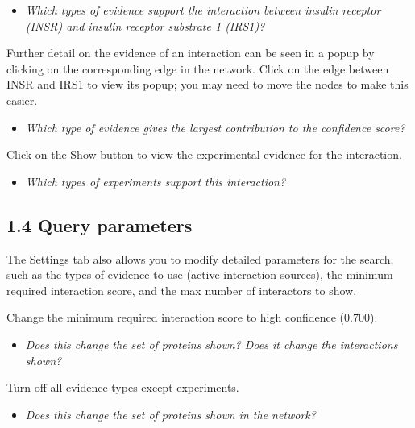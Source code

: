 \documentclass[a4paper]{article}
\begin{document}
\begin{itemize}
  \item \textit{Which types of evidence support the interaction between insulin receptor (INSR) and insulin receptor substrate 1 (IRS1)?}
\end{itemize}

Further detail on the evidence of an interaction can be seen in a popup by clicking on the corresponding edge in the network. Click on the edge between INSR and IRS1 to view its popup; you may need to move the nodes to make this easier.

\begin{itemize}
  \item \textit{Which type of evidence gives the largest contribution to the confidence score?}
\end{itemize}

Click on the Show button to view the experimental evidence for the interaction.

\begin{itemize}
  \item \textit{Which types of experiments support this interaction?}
\end{itemize}

\vspace{0,5cm}

\subsection*{1.4 Query parameters}
The Settings tab also allows you to modify detailed parameters for the search, such as the types of evidence to use (active interaction sources), the minimum required interaction score, and the max number of interactors to show.

\vspace{0,2cm}

Change the minimum required interaction score to high confidence (0.700).

\begin{itemize}
  \item \textit{Does this change the set of proteins shown? Does it change the interactions shown?}
\end{itemize}

Turn off all evidence types except experiments.

\begin{itemize}
  \item \textit{Does this change the set of proteins shown in the network?}
\end{itemize}
\end{document}
